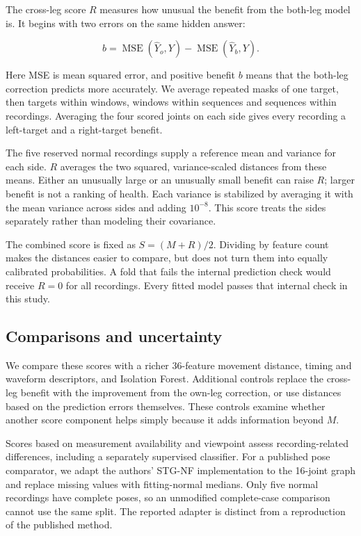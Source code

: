 \documentclass[letterpaper]{article}
\begin{document}
The cross-leg score \(R\) measures how unusual the benefit from the both-leg model is. It begins with two errors on the same hidden answer:

\begin{equation}
b=\operatorname{MSE}(\widehat Y_o,Y)-\operatorname{MSE}(\widehat Y_b,Y).
\end{equation}

Here MSE is mean squared error, and positive benefit \(b\) means that the both-leg correction predicts more accurately. We average repeated masks of one target, then targets within windows, windows within sequences and sequences within recordings. Averaging the four scored joints on each side gives every recording a left-target and a right-target benefit.

The five reserved normal recordings supply a reference mean and variance for each side. \(R\) averages the two squared, variance-scaled distances from these means. Either an unusually large or an unusually small benefit can raise \(R\); larger benefit is not a ranking of health. Each variance is stabilized by averaging it with the mean variance across sides and adding \(10^{-8}\). This score treats the sides separately rather than modeling their covariance.

The combined score is fixed as \(S=(M+R)/2\). Dividing by feature count makes the distances easier to compare, but does not turn them into equally calibrated probabilities. A fold that fails the internal prediction check would receive \(R=0\) for all recordings. Every fitted model passes that internal check in this study.

\subsection{Comparisons and uncertainty}

We compare these scores with a richer 36-feature movement distance, timing and waveform descriptors, and Isolation Forest. Additional controls replace the cross-leg benefit with the improvement from the own-leg correction, or use distances based on the prediction errors themselves. These controls examine whether another score component helps simply because it adds information beyond \(M\).

Scores based on measurement availability and viewpoint assess recording-related differences, including a separately supervised classifier. For a published pose comparator, we adapt the authors' STG-NF implementation to the 16-joint graph and replace missing values with fitting-normal medians. Only five normal recordings have complete poses, so an unmodified complete-case comparison cannot use the same split. The reported adapter is distinct from a reproduction of the published method.
\end{document}

